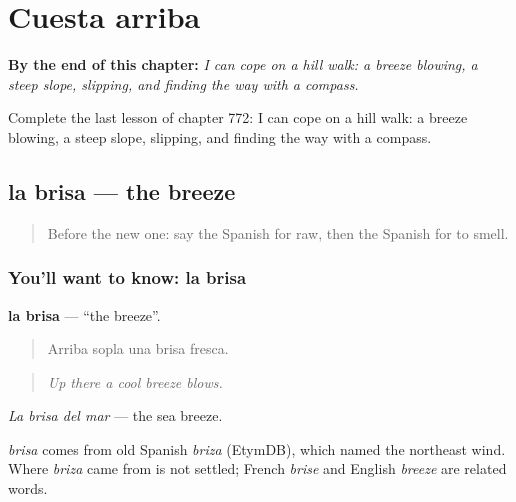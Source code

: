 
\chapter{Cuesta arriba}
\label{ch:es-cuesta-arriba}

\begin{chapteropening}
\textbf{By the end of this chapter:} \emph{I can cope on a hill walk: a breeze blowing, a steep slope, slipping, and finding the way with a compass.}

Complete the last lesson of chapter 772: I can cope on a hill walk: a breeze blowing, a steep slope, slipping, and finding the way with a compass.
\end{chapteropening}

\section[la brisa]{la brisa — the breeze}

\label{lesson:ES-C772-brisa}



\begin{quote}
Before the new one: say the Spanish for raw, then the Spanish for to smell.
\end{quote}

\subsection*{You'll want to know: la brisa}
\textbf{la brisa} — \textquotedblleft{}the breeze\textquotedblright{}.

\begin{quote}
Arriba sopla una brisa fresca.
\end{quote}

\begin{quote}
\emph{Up there a cool breeze blows.}
\end{quote}

\emph{La brisa del mar} — the sea breeze.

\begin{cousinweb}
\emph{brisa} comes from old Spanish \emph{briza} (EtymDB), which named the northeast wind. Where \emph{briza} came from is not settled; French \emph{brise} and English \emph{breeze} are related words.
\end{cousinweb}

